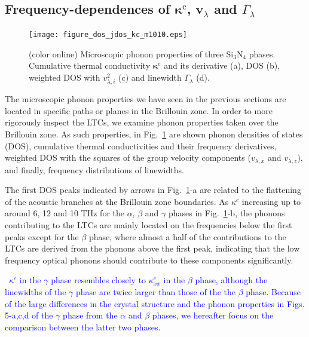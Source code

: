\documentclass[twocolumn,amsmath,amssymb,a4paper,prb,superscriptaddress,floatfix]{revtex4-1}
\begin{document}
\subsection{Frequency-dependences of $\boldsymbol{\kappa}^\text{c}$, $\mathbf{v}$$_\lambda$ and $\Gamma_\lambda$}

\begin{figure}[ht]
 \begin{center}
  \texttt{[image: figure\_dos\_jdos\_kc\_m1010.eps]}
  \caption{(color online) Microscopic phonon properties of three Si$_3$N$_4$
	  phases. Cumulative thermal conductivity $\mathbf{\kappa}^\text{c}$ and its derivative
	  (a), DOS (b), weighted DOS with $v_{\lambda,i}^2$ (c) and linewidth $\Gamma_\lambda$ (d).
  \label{fig:Fig5_338_rev} }
 \end{center}
\end{figure}

The microscopic phonon properties we have seen in the previous sections are
located in specific paths or planes in the Brillouin zone. In order to more
rigorously inspect the LTCs, we examine  phonon properties taken over the
Brillouin zone. As such properties, in Fig.~\ref{fig:Fig5_338_rev} are shown
phonon densities of states (DOS), cumulative thermal conductivities and their
frequency derivatives, weighted DOS with the squares of the group velocity
components ($v_{\lambda,x}$ and $v_{\lambda,z}$), and finally,
frequency distributions of linewidths. 

The first DOS peaks indicated by arrows in Fig.~\ref{fig:Fig5_338_rev}-a are
related to the flattening of the acoustic branches at the Brillouin zone
boundaries. As $\kappa^c$ increasing up to around 6, 12 and 10 THz for the
$\alpha$, $\beta$ and $\gamma$ phases in Fig.~\ref{fig:Fig5_338_rev}-b, the
phonons contributing to the LTCs are mainly located on the frequencies below
the first peaks except for the $\beta$ phase, where almost a half of the
contributions to the LTCs are derived from the phonons above the first peak,
indicating that the low frequency optical phonons should contribute to these
components significantly.  

~\textcolor{blue}{$\kappa^c$ in the $\gamma$ phase resembles closely to
$\kappa_{xx}^c$ in the $\beta$ phase, although the linewidths of the
$\gamma$ phase are twice larger than those of the the $\beta$ phase.
Because of the large differences in the crystal structure and the phonon
properties in Figs. 5-a,c,d of the $\gamma$ phase from the $\alpha$ and $\beta$
phases, we hereafter focus on the comparison between the latter two phases.} 
\end{document}
